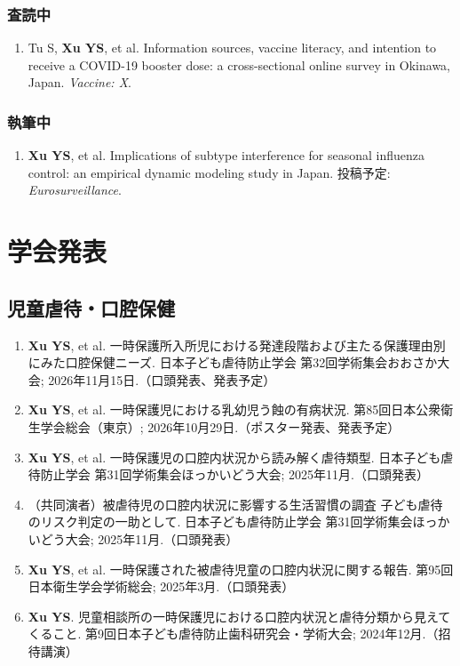 \documentclass[a4paper,10pt]{article}
\newcommand{\me}{\textbf{Xu YS}}
\begin{document}
\subsubsection{査読中}
\begin{enumerate}
  \item Tu S, \me, et al. Information sources, vaccine literacy, and intention to receive a COVID-19 booster dose: a cross-sectional online survey in Okinawa, Japan. \textit{Vaccine: X}.
\end{enumerate}
\subsubsection{執筆中}
\begin{enumerate}
  \item \me, et al. Implications of subtype interference for seasonal influenza control: an empirical dynamic modeling study in Japan. 投稿予定: \textit{Eurosurveillance}.
\end{enumerate}

\section{学会発表}
\subsection{児童虐待・口腔保健}
\begin{enumerate}
  \item \me, et al. 一時保護所入所児における発達段階および主たる保護理由別にみた口腔保健ニーズ. 日本子ども虐待防止学会 第32回学術集会おおさか大会; 2026年11月15日.（口頭発表、発表予定）
  \item \me, et al. 一時保護児における乳幼児う蝕の有病状況. 第85回日本公衆衛生学会総会（東京）; 2026年10月29日.（ポスター発表、発表予定）
  \item \me, et al. 一時保護児の口腔内状況から読み解く虐待類型. 日本子ども虐待防止学会 第31回学術集会ほっかいどう大会; 2025年11月.（口頭発表）
  \item （共同演者）被虐待児の口腔内状況に影響する生活習慣の調査 子ども虐待のリスク判定の一助として. 日本子ども虐待防止学会 第31回学術集会ほっかいどう大会; 2025年11月.（口頭発表）
  \item \me, et al. 一時保護された被虐待児童の口腔内状況に関する報告. 第95回日本衛生学会学術総会; 2025年3月.（口頭発表）
  \item \me. 児童相談所の一時保護児における口腔内状況と虐待分類から見えてくること. 第9回日本子ども虐待防止歯科研究会・学術大会; 2024年12月.（招待講演）
\end{enumerate}
\end{document}
